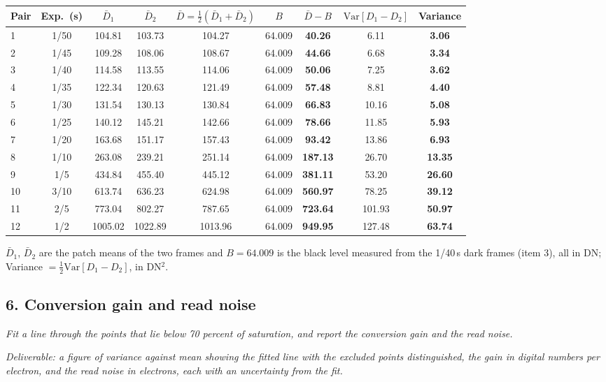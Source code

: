 \documentclass[11pt]{article}
\newcommand{\task}[3]{\subsection*{#1}{\sloppy\noindent\textit{#2}\par}\smallskip\noindent\textit{Deliverable: #3}\par\medskip}
\begin{document}
\begin{center}
\small
\begin{tabular}{lcccccccc}
\toprule
Pair & Exp.\ (s) & $\bar{D}_1$ & $\bar{D}_2$ & $\bar{D} = \tfrac{1}{2}(\bar{D}_1 + \bar{D}_2)$ & $B$ & {\boldmath $\bar{D} - B$} & $\mathrm{Var}[D_1 - D_2]$ & \textbf{Variance} \\
\midrule
1  & 1/50 & 104.81 & 103.73 & 104.27 & 64.009 & \textbf{40.26} & 6.11 & \textbf{3.06} \\
2  & 1/45 & 109.28 & 108.06 & 108.67 & 64.009 & \textbf{44.66} & 6.68 & \textbf{3.34} \\
3  & 1/40 & 114.58 & 113.55 & 114.06 & 64.009 & \textbf{50.06} & 7.25 & \textbf{3.62} \\
4  & 1/35 & 122.34 & 120.63 & 121.49 & 64.009 & \textbf{57.48} & 8.81 & \textbf{4.40} \\
5  & 1/30 & 131.54 & 130.13 & 130.84 & 64.009 & \textbf{66.83} & 10.16 & \textbf{5.08} \\
6  & 1/25 & 140.12 & 145.21 & 142.66 & 64.009 & \textbf{78.66} & 11.85 & \textbf{5.93} \\
7  & 1/20 & 163.68 & 151.17 & 157.43 & 64.009 & \textbf{93.42} & 13.86 & \textbf{6.93} \\
8  & 1/10 & 263.08 & 239.21 & 251.14 & 64.009 & \textbf{187.13} & 26.70 & \textbf{13.35} \\
9  & 1/5  & 434.84 & 455.40 & 445.12 & 64.009 & \textbf{381.11} & 53.20 & \textbf{26.60} \\
10 & 3/10 & 613.74 & 636.23 & 624.98 & 64.009 & \textbf{560.97} & 78.25 & \textbf{39.12} \\
11 & 2/5  & 773.04 & 802.27 & 787.65 & 64.009 & \textbf{723.64} & 101.93 & \textbf{50.97} \\
12 & 1/2  & 1005.02 & 1022.89 & 1013.96 & 64.009 & \textbf{949.95} & 127.48 & \textbf{63.74} \\
\bottomrule
\end{tabular}
\end{center}

\noindent $\bar{D}_1$, $\bar{D}_2$ are the patch means of the two frames and $B = 64.009$ is the black level measured from the 1/40\,s dark frames (item 3), all in DN; Variance $= \tfrac{1}{2}\mathrm{Var}[D_1 - D_2]$, in DN$^2$.

\task{6. Conversion gain and read noise}
{Fit a line through the points that lie below 70 percent of saturation, and report the conversion gain and the read noise.}
{a figure of variance against mean showing the fitted line with the excluded points distinguished, the gain in digital numbers per electron, and the read noise in electrons, each with an uncertainty from the fit.}
\end{document}
